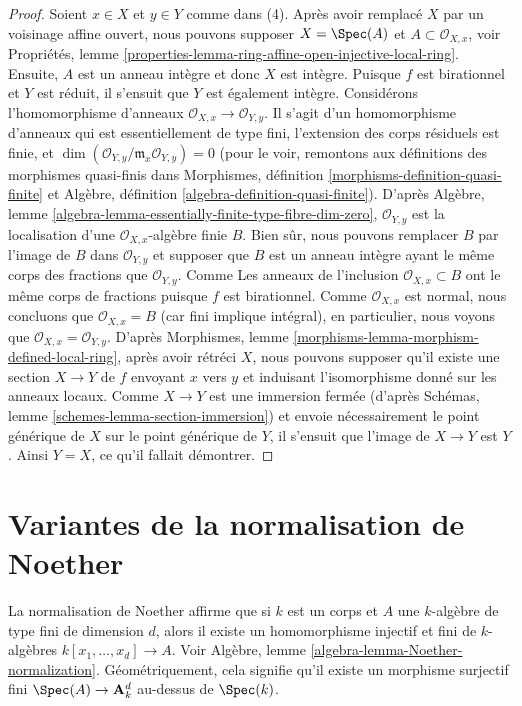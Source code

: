 \begin{proof}
\medskip\noindent
Soient $x \in X$ et $y \in Y$ comme dans (4). Après
avoir remplacé $X$ par un voisinage affine ouvert, nous pouvons
supposer $X = \Spec(A)$ et $A \subset \mathcal{O}_{X, x}$, voir
Propriétés, lemme
\ref{properties-lemma-ring-affine-open-injective-local-ring}.
Ensuite, $A$ est un anneau intègre et donc $X$ est intègre. Puisque $f$
est birationnel et $Y$ est réduit, il s'ensuit que $Y$ est
également intègre. Considérons l'homomorphisme d'anneaux
$\mathcal{O}_{X, x} \to \mathcal{O}_{Y, y}$. Il s'agit d'un
homomorphisme d'anneaux qui est essentiellement de type fini,
l'extension des corps résiduels est finie, et $\dim(\mathcal{O}_{Y,
y}/\mathfrak m_x\mathcal{O}_{Y, y}) = 0$ (pour le voir, remontons
aux définitions des morphismes quasi-finis dans
Morphismes, définition \ref{morphisms-definition-quasi-finite} et
Algèbre, définition \ref{algebra-definition-quasi-finite}). D'après
Algèbre, lemme
\ref{algebra-lemma-essentially-finite-type-fibre-dim-zero},
$\mathcal{O}_{Y, y}$ est la localisation d'une
$\mathcal{O}_{X, x}$-algèbre finie $B$. Bien sûr, nous pouvons remplacer $B$ par
l'image de $B$ dans $\mathcal{O}_{Y, y}$ et supposer que $B$ est un
anneau intègre ayant le même corps des fractions que $\mathcal{O}_{Y, y}$. Comme
Les anneaux de l'inclusion $\mathcal{O}_{X, x} \subset B$ ont le même corps de fractions puisque $f$ est birationnel.
Comme $\mathcal{O}_{X, x}$ est normal, nous concluons que
$\mathcal{O}_{X, x} = B$ (car fini implique intégral), en particulier, nous
voyons que $\mathcal{O}_{X, x} = \mathcal{O}_{Y, y}$. D'après Morphismes,
lemme \ref{morphisms-lemma-morphism-defined-local-ring}, après avoir rétréci
$X$, nous pouvons supposer qu'il existe une section $X \to Y$ de $f$
envoyant $x$ vers $y$ et induisant l'isomorphisme donné sur les anneaux
locaux. Comme $X \to Y$ est une immersion fermée (d'après Schémas, lemme
\ref{schemes-lemma-section-immersion}) et envoie nécessairement le point
générique de $X$ sur le point générique de $Y$, il s'ensuit que l'image
de $X \to Y$ est $Y$. Ainsi $Y = X$, ce qu'il fallait démontrer.
\end{proof}






\section{Variantes de la normalisation de Noether}
\label{section-noether-normalization}

\noindent
La normalisation de Noether affirme que si $k$ est un corps
et $A$ une $k$-algèbre de type fini de dimension $d$, alors
il existe un homomorphisme injectif et fini de $k$-algèbres
$k[x_1,
\ldots, x_d] \to A$. Voir Algèbre, lemme
\ref{algebra-lemma-Noether-normalization}.
Géométriquement, cela signifie qu'il existe un morphisme
surjectif fini $\Spec(A) \to \mathbf{A}^d_k$ au-dessus de $\Spec(k)$.

